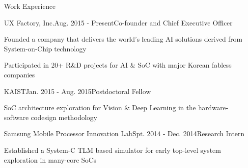 \documentclass{resume} %
\begin{document}


\makecvheader


\begin{section}{Work Experience}

\begin{subsection}{UX Factory, Inc.}{Aug. 2015 - Present}{Co-founder and Chief Executive Officer}{}
\item Founded a company that delivers the world's leading AI solutions derived from System-on-Chip technology
\item Participated in 20+ R\&D projects for AI \& SoC with major Korean fabless companies
\end{subsection}

\begin{subsection}{KAIST}{Jan. 2015 - Aug. 2015}{Postdoctoral Fellow}{}
\item SoC architecture exploration for Vision \& Deep Learning in the hardware-software codesign methodology
\end{subsection}

\begin{subsection}{Samsung Mobile Processor Innovation Lab}{Spt. 2014 - Dec. 2014}{Research Intern}{}
\item Established a System-C TLM based simulator for early top-level system exploration in many-core SoCs
\end{subsection}

\end{section}

\end{document}
